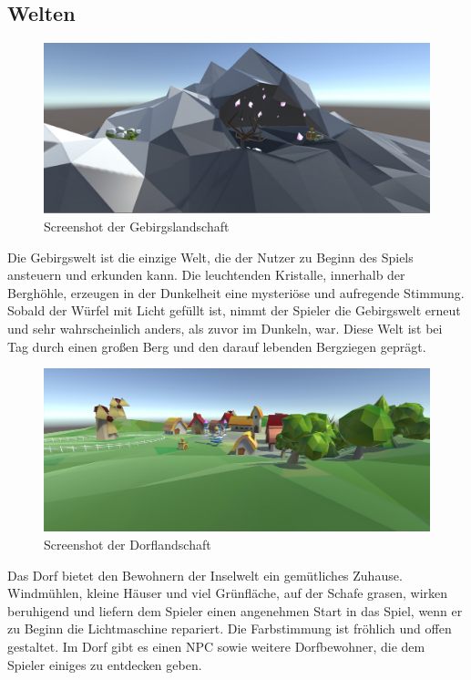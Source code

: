 \subsection{Welten}

\begin{figure}[!htbp]%
	\centering
		\includegraphics[width=1.0\textwidth]{images/Gebirge}
	\caption{Screenshot der Gebirgslandschaft}
	\label{fig:Gebirge}
\end{figure}

Die Gebirgswelt ist die einzige Welt, die der Nutzer zu Beginn des Spiels ansteuern und erkunden kann. Die leuchtenden Kristalle, innerhalb der Berghöhle, erzeugen in der Dunkelheit eine mysteriöse und aufregende Stimmung. Sobald der Würfel mit Licht gefüllt ist, nimmt der Spieler die Gebirgswelt erneut und sehr wahrscheinlich anders, als zuvor im Dunkeln, war. Diese Welt ist bei Tag durch einen großen Berg und den darauf lebenden Bergziegen geprägt.


\begin{figure}[!htbp]%
	\centering
		\includegraphics[width=1.0\textwidth]{images/Dorf}
	\caption{Screenshot der Dorflandschaft}
	\label{fig:Dorf}
\end{figure}

Das Dorf bietet den Bewohnern der Inselwelt ein gemütliches Zuhause. Windmühlen, kleine Häuser und viel Grünfläche, auf der Schafe grasen, wirken beruhigend und liefern dem Spieler einen angenehmen Start in das Spiel, wenn er zu Beginn die Lichtmaschine repariert. Die Farbstimmung ist fröhlich und offen gestaltet. Im Dorf gibt es einen NPC sowie weitere Dorfbewohner, die dem Spieler einiges zu entdecken geben.

